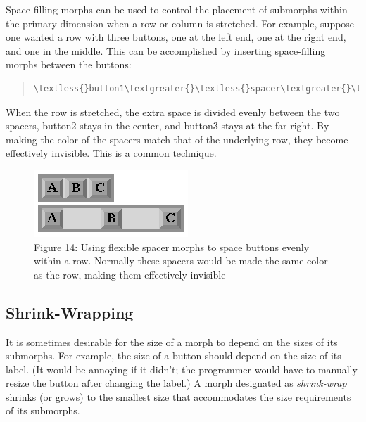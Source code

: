 \documentclass[letterpaper,10pt,english]{sphinxmanual}
\begin{document}
Space-filling morphs can be used to control the placement of submorphs within the primary dimension when a row or column is stretched. For example, suppose one wanted a row with three buttons, one at the left end, one at the right end, and one in the middle. This can be accomplished by inserting space-filling morphs between the buttons:
\begin{quote}

\begin{Verbatim}[commandchars=\\\{\}]
\textless{}button1\textgreater{}\textless{}spacer\textgreater{}\textless{}button2\textgreater{}\textless{}spacer\textgreater{}\textless{}button3\textgreater{}
\end{Verbatim}
\end{quote}

When the row is stretched, the extra space is divided evenly between the two spacers, button2 stays in the center, and button3 stays at the far right. By making the color of the spacers match that of the underlying row, they become effectively invisible. This is a common technique.
\begin{figure}[htbp]\begin{flushleft}
\capstart

\includegraphics{Figure14.png}
\caption{Figure 14: Using flexible spacer morphs to space buttons evenly within a row. Normally these spacers would be made the same color as the row, making them effectively invisible}\end{flushleft}\end{figure}


\subsection{Shrink-Wrapping}
\label{morphic:shrink-wrapping}
It is sometimes desirable for the size of a morph to depend on the sizes of its submorphs. For example, the size of a button should depend on the size of its label. (It would be annoying if it didn't; the programmer would have to manually resize the button after changing the label.) A morph designated as \emph{shrink-wrap} shrinks (or grows) to the smallest size that accommodates the size requirements of its submorphs.
\end{document}
